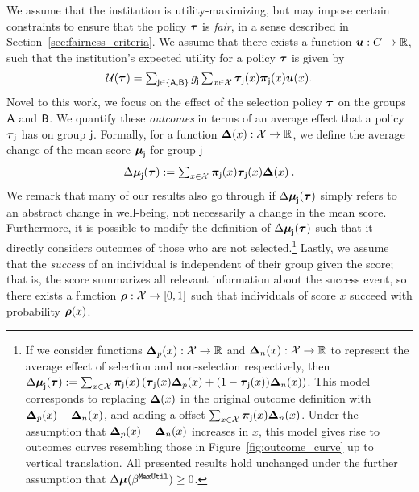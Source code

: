 We assume that the institution is utility-maximizing, but may impose certain constraints to ensure that the policy $\boldsymbol{\tau}$ is \emph{fair}, in a sense described in Section~\ref{sec:fairness_criteria}. We assume that there exists a function $\boldsymbol{u}: C \to \mathbb{R}$, such that the institution's expected utility for a policy $\boldsymbol{\tau}$ is given by 
\begin{eqnarray}
\textstyle
\label{eqn:inst_util}
\mathcal{U}(\boldsymbol{\tau}) = \sum_{\mathsf{j} \in \{\mathsf{A}, \mathsf{B}\} } g_{\mathsf{j}}\sum_{x \in \mathcal{X}} \boldsymbol{\tau}_{\mathsf{j}}(x)\boldsymbol{\pi}_{\mathsf{j}}(x)\boldsymbol{u}(x).
\end{eqnarray}
Novel to this work, we focus on the effect of the selection policy $\boldsymbol{\tau}$ on the groups $\mathsf{A}$ and $\mathsf{B}$. 
We quantify these \emph{outcomes} in terms of an average effect that a policy $\boldsymbol{\tau}_{\mathsf{j}}$ has on group $\mathsf{j}$. Formally, for a function $\boldsymbol{\Delta}(x):\mathcal{X} \to \mathbb{R}$, we define the average change of the mean score $\boldsymbol{\mu}_{\mathsf{j}}$ for group $\mathsf{j}$ 
\begin{eqnarray}
\textstyle
\label{eqn:delmean}
\Delta\boldsymbol{\mu}_{\mathsf{j}} (\boldsymbol{\tau}) := \sum_{x \in \mathcal{X}} \boldsymbol{\pi}_{\mathsf{j}}(x)\boldsymbol{\tau}_{\mathsf{j}}(x)\boldsymbol{\Delta}(x) \:. 
\end{eqnarray}
We remark that many of our results also go through if $\Delta\boldsymbol{\mu}_{\mathsf{j}}(\boldsymbol{\tau})$ simply refers to an abstract change in well-being, not necessarily a change in the mean score. Furthermore, it is possible to modify the definition of $\Delta\boldsymbol{\mu}_{\mathsf{j}}(\boldsymbol{\tau})$ such that it directly considers outcomes of those who are not selected.\footnote{\label{footnote:negative_dec_outcomes}
If we consider functions $\boldsymbol{\Delta}_p(x):\mathcal{X} \to \mathbb{R}$ and $\boldsymbol{\Delta}_n(x):\mathcal{X} \to \mathbb{R}$ to represent the average effect of selection and non-selection respectively, then $
\Delta\boldsymbol{\mu}_{\mathsf{j}} (\boldsymbol{\tau}) := \sum_{x \in \mathcal{X}} \boldsymbol{\pi}_{\mathsf{j}}(x) \left(\boldsymbol{\tau}_{\mathsf{j}}(x)\boldsymbol{\Delta}_p(x) + (1-\boldsymbol{\tau}_{\mathsf{j}}(x))\boldsymbol{\Delta}_n(x) \right)$.
This model corresponds to replacing $\boldsymbol{\Delta}(x)$ in the original outcome definition with $\boldsymbol{\Delta}_p(x)-\boldsymbol{\Delta}_n(x)$, and adding a offset $\sum_{x \in \mathcal{X}} \boldsymbol{\pi}_{\mathsf{j}}(x)\boldsymbol{\Delta}_n(x)$. Under the assumption that $\boldsymbol{\Delta}_p(x)-\boldsymbol{\Delta}_n(x)$ increases in $x$, this model gives rise to outcomes curves resembling those in Figure~\ref{fig:outcome_curve} up to vertical translation. All presented results hold unchanged under the further assumption that $\Delta\boldsymbol{\mu} (\beta^{\mathtt{MaxUtil}}) \geq 0$.
}
Lastly, we assume that the \emph{success} of an individual is independent of their group given the score; that is, the score summarizes all relevant information about the success event, so there exists a function $\boldsymbol{\rho}:\mathcal{X} \to [0,1]$ such that individuals of score $x$ succeed with probability $\boldsymbol{\rho}(x)$.

